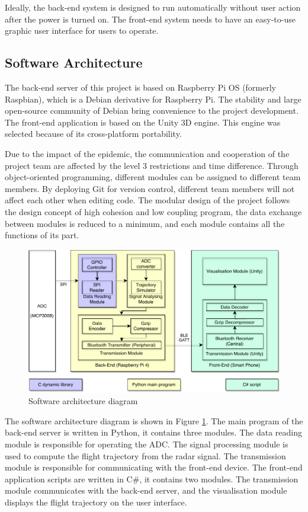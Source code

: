 Ideally, the back-end system is designed to run automatically without user action after the power is turned on. The front-end system needs to have an easy-to-use graphic user interface for users to operate.



\subsection{Software Architecture}
The back-end server of this project is based on Raspberry Pi OS (formerly Raspbian), which is a Debian derivative for Raspberry Pi. The stability and large open-source community of Debian bring convenience to the project development. The front-end application is based on the Unity 3D engine. This engine was selected because of its cross-platform portability.
\par
Due to the impact of the epidemic, the communication and cooperation of the project team are affected by the level 3 restrictions and time difference. Through object-oriented programming, different modules can be assigned to different team members. By deploying Git for version control, different team members will not affect each other when editing code. The modular design of the project follows the design concept of high cohesion and low coupling program, the data exchange between modules is reduced to a minimum, and each module contains all the functions of its part.
\begin{figure}[H]
    \centering
    \includegraphics[width=\textwidth]{figure/Software.pdf}
    \caption{Software architecture diagram}
    \label{fig:software_diagram}
\end{figure}
The software architecture diagram is shown in Figure \ref{fig:software_diagram}. The main program of the back-end server is written in Python, it contains three modules. The data reading module is responsible for operating the ADC. The signal processing module is used to compute the flight trajectory from the radar signal. The transmission module is responsible for communicating with the front-end device. The front-end application scripts are written in C\#, it contains two modules. The transmission module communicates with the back-end server, and the visualisation module displays the flight trajectory on the user interface.


